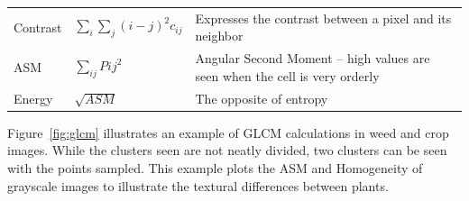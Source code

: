 \documentclass[letterpaper]{article}
\begin{document}
{\begin{longtable}{x{\dimexpr.15\tabcolsep}
                  x{\dimexpr.225\tabcolsep}
                  x{\dimexpr.625\tabcolsep}}
		Contrast      
		& $\sum_{i}\sum_{j}{(i - j)}^2 c_{ij}$ 
		& Expresses the contrast between a pixel and its neighbor
\tabularnewline\addlinespace

		ASM      
		& $\sum_{ij}P{ij}^2$
		& Angular Second Moment -- high values are seen when the cell is very orderly
\tabularnewline\addlinespace

		Energy   
		& $\sqrt{ASM}$ 
		& The opposite of entropy
\label{table:glcm-formulae}
\end{longtable}

Figure~\ref{fig:glcm} illustrates an example of GLCM calculations in weed and crop images. While the clusters seen are not neatly divided, two clusters can be seen with the points sampled. This example plots the ASM and Homogeneity of grayscale images to illustrate the textural differences between plants.

}
\end{document}
